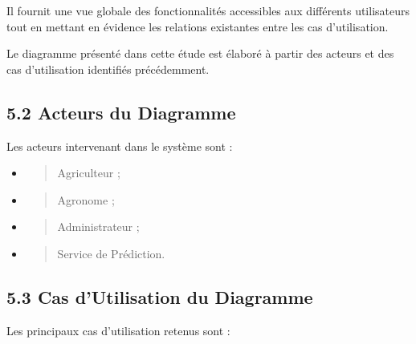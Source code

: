 \documentclass[
]{article}
\begin{document}
Il fournit une vue globale des fonctionnalités accessibles aux
différents utilisateurs tout en mettant en évidence les relations
existantes entre les cas d'utilisation.

Le diagramme présenté dans cette étude est élaboré à partir des acteurs
et des cas d'utilisation identifiés précédemment.

\hypertarget{acteurs-du-diagramme}{%
\subsection{5.2 Acteurs du Diagramme}\label{acteurs-du-diagramme}}

Les acteurs intervenant dans le système sont :

\begin{itemize}
\item
  \begin{quote}
  Agriculteur ;
  \end{quote}
\item
  \begin{quote}
  Agronome ;
  \end{quote}
\item
  \begin{quote}
  Administrateur ;
  \end{quote}
\item
  \begin{quote}
  Service de Prédiction.
  \end{quote}
\end{itemize}

\hypertarget{cas-dutilisation-du-diagramme}{%
\subsection{5.3 Cas d'Utilisation du
Diagramme}\label{cas-dutilisation-du-diagramme}}

Les principaux cas d'utilisation retenus sont :
\end{document}
